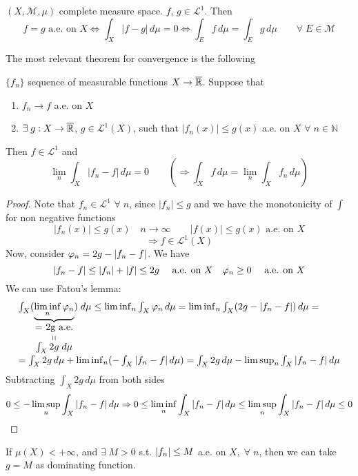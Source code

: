 \begin{theorem}
    \((X, \mathcal{M}, \mu)\) complete measure space. \(f\), \(g \in \mathcal{L}^1\). Then
    \[
        f= g \text{ a.e. on } X \Leftrightarrow \int_X |f-g| \, d\mu =0 \Leftrightarrow \int_E f \, d\mu = \int_E g \, d\mu \qquad \forall \; E \in \mathcal{M} 
    \]
\end{theorem}
The most relevant theorem for convergence is the following
\begin{theorem}
    \(\{f_n\}\) sequence of measurable functions \(X \to \overline{\mathbb{R}}\). Suppose that
    \begin{enumerate}
        \item \(f_n \to f \) a.e. on \(X\)
        \item \(\exists \; g : X \to \overline{\mathbb{R}} \), \(g \in \mathcal{L}^1(X)\), such that \(|f_n(x)| \leq g(x)\) a.e. on \(X\) \(\forall \; n \in \mathbb{N}\)
    \end{enumerate}
    Then \(f \in \mathcal{L}^1\) and 
    \[
        \lim_n \int_X |f_n -f| \, d\mu = 0 
        \qquad \left( \Rightarrow \int_X f \, d\mu = \lim_n \int_X f_n \, d\mu \right)  
    \]
\end{theorem}
\begin{proof}
    Note that \(f_n \in \mathcal{L}^1\) \(\forall \; n\), since \(|f_n| \leq g\) and we have the monotonicity of \(\int\) for non negative functions
    \[
        |f_n(x)| \leq g(x) \quad
        n \to \infty \qquad
        |f(x)| \leq g(x) \text{  a.e. on } X 
    \]
    \[ 
        \Rightarrow f \in \mathcal{L}^1(X)
    \]  
    Now, consider \(\oldphi_n = 2g - |f_n - f|\). We have
    \[
        |f_n-f| \leq |f_n|+|f| \leq 2g \quad \text{ a.e. on }X \quad \oldphi_n \geq 0 \quad \text{ a.e. on }X  
    \]
    We can use Fatou's lemma:
    \[\begin{array}{l}
        \int_X (\underbrace{\liminf_n \oldphi_n}_{\stackbelowlittle{\mbox{= 2g a.e.}}{\int_X 2g \; d\mu}}) \; d\mu \leq \liminf_n \int_X \oldphi_n \, d\mu = \liminf_n \int_X (2g - \abs{f_n - f}) \, d\mu = \\
        = \int_X 2g \, d\mu + \liminf_n (-\int_X \abs{f_n - f} \, d\mu) =\int_X 2g \, d\mu - \limsup_n \int_X \abs{f_n - f} \, d\mu
    \end{array}
    \]
    Subtracting \(\int_X 2g \, d\mu\) from both sides 
    \[
        0 \leq -\limsup_n \int_X \abs{f_n - f} \, d\mu \Rightarrow 0 \leq \liminf_n \int_X \abs{f_n - f} \, d\mu \leq \limsup_n \int_X \abs{f_n - f} \, d\mu \leq 0 
    \]  
\end{proof}
\begin{remark}
    If \(\mu(X) < +\infty\), and \(\exists \; M > 0\) s.t. \(\abs{f_n} \leq M\) a.e. on \(X, \; \forall \; n\), then we can take \(g = M\) as dominating function.
\end{remark}


